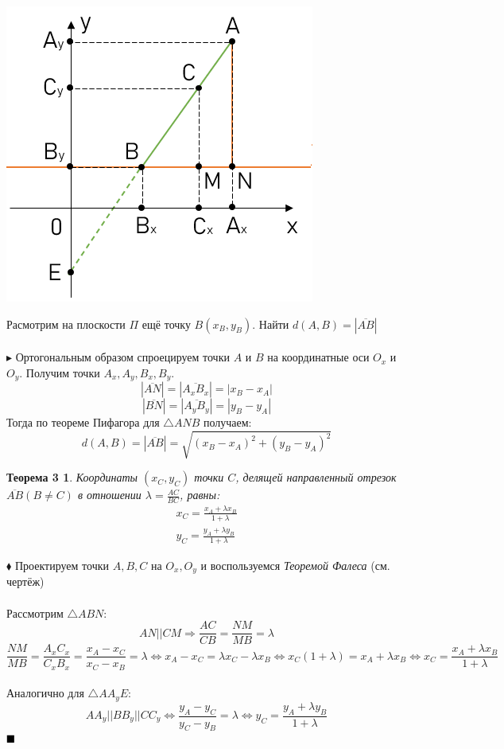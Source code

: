 \documentclass[a4paper, 12pt]{report}
\begin{document}
	\begin{center}
		\includegraphics{img/1.2.1 C between AB.png}\\
	\end{center}
	Расмотрим на плоскости $\Pi$ ещё точку $B (x_B, y_B)$. Найти $d(A, B) = |\overline{AB}|$ \\\\	
	$\blacktriangleright$ Ортогональным образом спроецируем точки $A$ и $B$ на координатные оси $O_x$ и $O_y$. Получим точки $A_x, A_y, B_x, B_y$.
	$$|\overline{AN}| = |\overline{A_xB_x}| = |x_B - x_A|$$
	$$|\overline{BN}| = |\overline{A_yB_y}| = |y_B - y_A|$$
	Тогда по теореме Пифагора для $\bigtriangleup$$ANB$ получаем:
	\begin{equation}\label{1.9}
		d(A, B) = |\overline{AB}| = \sqrt{(x_B - x_A)^2 + (y_B - y_A)^2} \tag{9}
	\end{equation}
	\newtheorem*{Th3}{Теорема 3}
	\begin{Th3}
		Координаты $(x_C, y_C)$ точки $C$, делящей направленный отрезок $\overline{AB} (B \ne C)$ в отношении $\lambda = \frac{AC}{BC}$, равны:
		\begin{equation}\label{1.10}
			\left.
			\boxed{\begin{aligned}
				x_C = \frac{x_A + \lambda x_B}{1 + \lambda} \\
				y_C = \frac{y_A + \lambda y_B}{1 + \lambda}
			\end{aligned}}
			\right. \tag{10}
		\end{equation}
	\end{Th3}
	$\blacklozenge$ \quad{} Проектируем точки $A, B, C$ на $O_x, O_y$ и воспользуемся \textit{Теоремой Фалеса} (см. чертёж)\\\\
	\qquad{} Рассмотрим $\bigtriangleup$$ABN$:
	$$AN || CM \Rightarrow \frac{AC}{CB} = \frac{NM}{MB} = \lambda$$
	$$\frac{NM}{MB} = \frac{A_xC_x}{C_xB_x} = \frac{x_A - x_C}{x_C - x_B} = \lambda \Leftrightarrow x_A - x_C = \lambda x_C - \lambda x_B \Leftrightarrow x_C (1 + \lambda) = x_A + \lambda x_B \Leftrightarrow x_C = \frac{x_A + \lambda x_B}{1 + \lambda}$$ \\
	Аналогично для $\bigtriangleup$$AA_yE$: 
	$$AA_y || BB_y || CC_y \Leftrightarrow \frac{y_A - y_C}{y_C - y_B} = \lambda \Leftrightarrow y_C = \frac{y_A + \lambda y_B}{1 + \lambda}$$ $\hfill\blacksquare$
	
\end{document}

